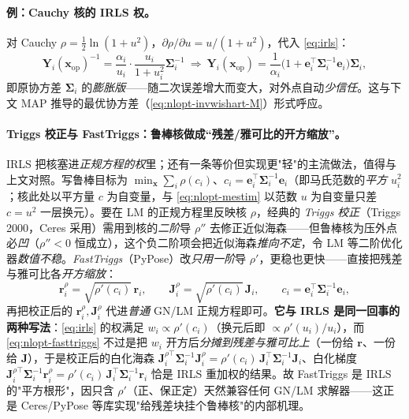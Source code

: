 \paragraph{例：Cauchy 核的 IRLS 权。}\cite{barfoot2024state}
对 Cauchy $\rho=\tfrac12\ln(1+u^2)$，$\partial\rho/\partial u=u/(1+u^2)$，代入 \cref{eq:irls}：
\begin{equation}
  \mathbf{Y}_i(\mathbf{x}_{\mathrm{op}})^{-1}=\frac{\alpha_i}{u_i}\cdot\frac{u_i}{1+u_i^2}\boldsymbol{\Sigma}_i^{-1}
  \ \Rightarrow\ \mathbf{Y}_i(\mathbf{x}_{\mathrm{op}})=\frac{1}{\alpha_i}\big(1+\mathbf{e}_i^\top\boldsymbol{\Sigma}_i^{-1}\mathbf{e}_i\big)\boldsymbol{\Sigma}_i,
  \label{eq:nlopt-cauchy-Y}
\end{equation}
即原协方差 $\boldsymbol{\Sigma}_i$ 的\emph{膨胀版}——随二次误差增大而变大，对外点自动\emph{少信任}。这与下文 MAP 推导的最优协方差（\cref{eq:nlopt-invwishart-M}）形式呼应。

\paragraph{Triggs 校正与 FastTriggs：鲁棒核做成“残差/雅可比的开方缩放”。}\cite{carlone2026handbook,triggs2000ba}
IRLS 把核塞进\emph{正规方程的权}里；还有一条等价但实现更"轻"的主流做法，值得与上文对照。写鲁棒目标为 $\min_{\mathbf{x}}\sum_i\rho(c_i)$、$c_i=\mathbf{e}_i^\top\boldsymbol{\Sigma}_i^{-1}\mathbf{e}_i$（即马氏范数的\emph{平方} $u_i^2$；核此处以平方量 $c$ 为自变量，与 \cref{eq:nlopt-mestim} 以范数 $u$ 为自变量只差 $c=u^2$ 一层换元）。要在 LM 的正规方程里反映核 $\rho$，经典的 \emph{Triggs 校正}（Triggs 2000，Ceres 采用）需用到核的\emph{二阶}导 $\rho''$ 去修正近似海森——但鲁棒核为压外点必\emph{凹}（$\rho''<0$ 恒成立），这个负二阶项会把近似海森\emph{推向不定}，令 LM 等二阶优化器\emph{数值不稳}。\emph{FastTriggs}（PyPose）改\emph{只用一阶}导 $\rho'$，更稳也更快——直接把残差与雅可比各\emph{开方缩放}：
\begin{equation}
  \mathbf{r}_i^{\rho}=\sqrt{\rho'(c_i)}\,\mathbf{r}_i,\qquad
  \mathbf{J}_i^{\rho}=\sqrt{\rho'(c_i)}\,\mathbf{J}_i,\qquad c_i=\mathbf{e}_i^\top\boldsymbol{\Sigma}_i^{-1}\mathbf{e}_i,
  \label{eq:nlopt-fasttriggs}
\end{equation}
再把校正后的 $\mathbf{r}_i^\rho,\mathbf{J}_i^\rho$ 代进\emph{普通} GN/LM 正规方程即可。\textbf{它与 IRLS 是同一回事的两种写法}：\cref{eq:irls} 的权满足 $w_i\propto\rho'(c_i)$（换元后即 $\propto\rho'(u_i)/u_i$），而 \cref{eq:nlopt-fasttriggs} 不过是把 $w_i$ 开方后\emph{分摊到残差与雅可比上}（一份给 $\mathbf{r}$、一份给 $\mathbf{J}$），于是校正后的白化海森 $\mathbf{J}_i^{\rho\top}\boldsymbol{\Sigma}_i^{-1}\mathbf{J}_i^\rho=\rho'(c_i)\,\mathbf{J}_i^\top\boldsymbol{\Sigma}_i^{-1}\mathbf{J}_i$、白化梯度 $\mathbf{J}_i^{\rho\top}\boldsymbol{\Sigma}_i^{-1}\mathbf{r}_i^\rho=\rho'(c_i)\,\mathbf{J}_i^\top\boldsymbol{\Sigma}_i^{-1}\mathbf{r}_i$ 恰是 IRLS 重加权的结果。故 FastTriggs 是 IRLS 的"平方根形"，因只含 $\rho'$（正、保正定）天然兼容任何 GN/LM 求解器——这正是 Ceres/PyPose 等库实现"给残差块挂个鲁棒核"的内部机理。

